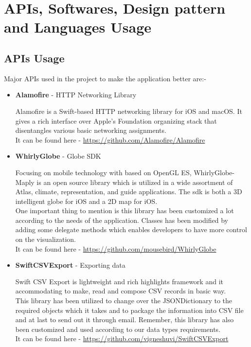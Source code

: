 \newpage


\section{APIs, Softwares, Design pattern and Languages Usage}

\subsection{APIs Usage}

Major APIs used in the project to make the application better are:-

\begin{itemize}
    \item \textbf{Alamofire} - HTTP Networking Library
    
    Alamofire is a Swift-based HTTP networking library for \gls{iOS} and \gls{macOS}. It gives a rich interface over Apple's Foundation organizing stack that disentangles various basic networking assignments.\\
    
    It can be found here - \url{https://github.com/Alamofire/Alamofire} \\
   
    \item \textbf{WhirlyGlobe} - Globe SDK
    
    Focusing on mobile technology with based on OpenGL ES, WhirlyGlobe-Maply is an open source library which is utilized in a wide assortment of Atlas, climate, representation, and guide applications. The \gls{sdk} is both a 3D intelligent globe for \gls{iOS} and a 2D map for \gls{iOS}. \\
    
    One important thing to mention is this library has been customized a lot according to the needs of the application. Classes has been modified by adding some delegate methods which enables developers to have more control on the visualization. \\
    
    It can be found here - \url{https://github.com/mousebird/WhirlyGlobe} \\
    
    \item \textbf{SwiftCSVExport} - Exporting data
    
    Swift CSV Export is lightweight and rich highlights framework and it accommodating to make, read and compose CSV records in basic way. \\
    
    This library has been utilized to change over the JSONDictionary to the required objects which it takes and to package the information into CSV file and at last to send out it through email. Remember, this library has also been customized and used according to our data types requirements. \\
    
    It can be found here - \url{https://github.com/vigneshuvi/SwiftCSVExport} \\ 
    
\end{itemize}

